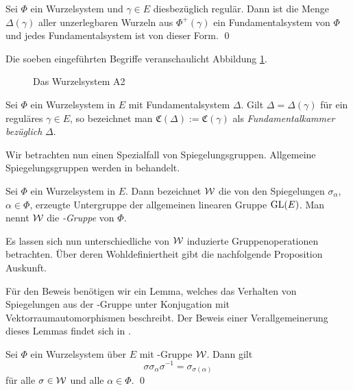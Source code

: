 \begin{thm}
  Sei $\Phi$ ein Wurzelsystem und $\gamma \in E$ diesbezüglich regulär.
  Dann ist die Menge $\Delta(\gamma)$ aller unzerlegbaren Wurzeln aus $\Phi^+(\gamma)$ ein Fundamentalsystem von $\Phi$ und jedes Fundamentalsystem ist von dieser Form. \qed
\end{thm}

Die soeben eingeführten Begriffe veranschaulicht Abbildung \ref{fig:fundamentalWeylChamber}.

\begin{figure}
  \caption{Das Wurzelsystem A2}
  \label{fig:fundamentalWeylChamber}
\end{figure}

\begin{defn}
  Sei $\Phi$ ein Wurzelsystem in $E$ mit Fundamentalsystem $\Delta$.
  Gilt $\Delta = \Delta(\gamma)$ für ein reguläres $\gamma \in E$, so bezeichnet man $\mathfrak{C}(\Delta) := \mathfrak{C}(\gamma)$ als \emph{Fundamentalkammer bezüglich} $\Delta$.
\end{defn}

Wir betrachten nun einen Spezialfall von Spiegelungsgruppen. Allgemeine Spiegelungsgruppen werden in \cite{humphreys1992reflection} behandelt.

\begin{defn}
  \label{def:weylgroup}
  Sei $\Phi$ ein Wurzelsystem in $E$. 
  Dann bezeichnet $\mathcal{W}$ die von den Spiegelungen $\sigma_\alpha$, $\alpha \in \Phi$, erzeugte Untergruppe der allgemeinen linearen Gruppe $\operatorname{GL}(E)$. 
  Man nennt $\mathcal{W}$ die \emph{\weyl\hyp{}Gruppe} von $\Phi$.
\end{defn}

Es lassen sich nun unterschiedliche von $\mathcal{W}$ induzierte Gruppenoperationen betrachten. Über deren Wohldefiniertheit gibt die nachfolgende Proposition Auskunft. 

Für den Beweis benötigen wir ein Lemma, welches das Verhalten von Spiegelungen aus der \weyl\hyp{}Gruppe unter Konjugation mit Vektorraumautomorphismen beschreibt. 
Der Beweis einer Verallgemeinerung dieses Lemmas findet sich in \cite[S.43]{humphreys1972introduction}.

\begin{lem}
  \label{lem:conjReflection}
  Sei $\Phi$ ein Wurzelsystem über $E$ mit \weyl\hyp{}Gruppe $\mathcal{W}$.
  Dann gilt 
  \begin{displaymath}
    \sigma \sigma_\alpha \sigma^{-1} = \sigma_{\sigma(\alpha)} 
  \end{displaymath}
  für alle $\sigma \in \mathcal{W}$ und alle $\alpha \in \Phi$. \qed
\end{lem}

